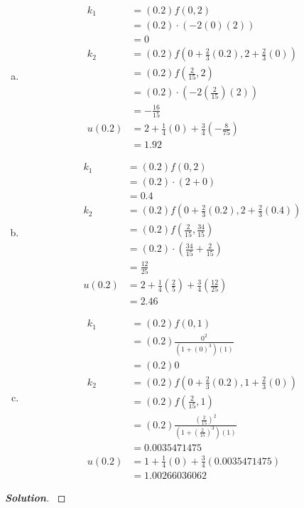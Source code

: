 \documentclass[11pt]{article}
\newenvironment{solution}{%
  \begin{proof}[\textbf{Solution}]$ $\par\nobreak\ignorespaces
}{%
  \end{proof}
}
\theoremstyle{definition}
\begin{document}
\begin{enumerate}[(a)]
    \item
    \begin{align*}
        k_1 &= (0.2) f(0, 2) \\
        &= (0.2) \cdot (-2(0)(2)) \\
        &= 0 \\
        k_2 &= (0.2) f(0 + \frac{2}{3}(0.2), 2 + \frac{2}{3}(0)) \\
        &= (0.2) f(\frac{2}{15}, 2) \\
        &= (0.2) \cdot (-2(\frac{2}{15})(2)) \\
        &= -\frac{16}{15} \\
        u(0.2) &= 2 + \frac{1}{4}(0) + \frac{3}{4}(-\frac{8}{75})\\
        &= 1.92
    \end{align*}
    \item
    \begin{align*}
        k_1 &= (0.2) f(0, 2) \\
        &= (0.2) \cdot (2 + 0) \\
        &= 0.4 \\
        k_2 &= (0.2) f(0 + \frac{2}{3}(0.2), 2 + \frac{2}{3}(0.4)) \\
        &= (0.2) f(\frac{2}{15}, \frac{34}{15}) \\
        &= (0.2) \cdot (\frac{34}{15} + \frac{2}{15}) \\
        &= \frac{12}{25} \\
        u(0.2) &= 2 + \frac{1}{4}(\frac{2}{5}) + \frac{3}{4}(\frac{12}{25}) \\
        &= 2.46
    \end{align*}
    \item
    \begin{align*}
        k_1 &= (0.2) f(0, 1) \\
        &= (0.2) \frac{0^2}{(1 + (0)^3)(1)} \\
        &= (0.2) 0 \\
        k_2 &= (0.2) f(0 + \frac{2}{3}(0.2), 1 + \frac{2}{3}(0)) \\
        &= (0.2) f(\frac{2}{15}, 1) \\
        &= (0.2) \frac{(\frac{2}{15})^2}{(1 + (\frac{2}{15})^3)(1)} \\
        &= 0.0035471475 \\
        u(0.2) &= 1 + \frac{1}{4}(0) + \frac{3}{4}(0.0035471475) \\
        &= 1.00266036062
    \end{align*}
\end{enumerate}
\begin{solution}
\end{solution}
\end{document}
